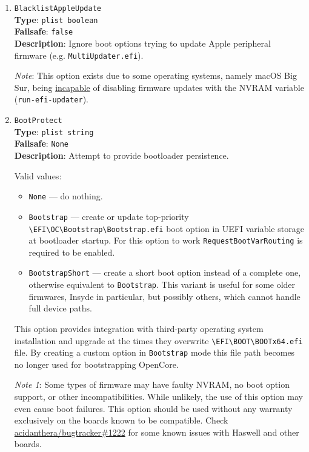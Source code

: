 \documentclass[]{article}
\providecommand{\tightlist}{%
  \setlength{\itemsep}{0pt}\setlength{\parskip}{0pt}}
\begin{document}
\begin{enumerate}
\item
  \texttt{BlacklistAppleUpdate}\\
  \textbf{Type}: \texttt{plist\ boolean}\\
  \textbf{Failsafe}: \texttt{false}\\
  \textbf{Description}: Ignore boot options trying to update Apple peripheral firmware
  (e.g. \texttt{MultiUpdater.efi}).

  \emph{Note}: This option exists due to some operating systems, namely macOS Big Sur,
  being \href{https://github.com/acidanthera/bugtracker/issues/1255}{incapable} of
  disabling firmware updates with the NVRAM variable (\texttt{run-efi-updater}).

\item
  \texttt{BootProtect}\\
  \textbf{Type}: \texttt{plist\ string}\\
  \textbf{Failsafe}: \texttt{None}\\
  \textbf{Description}: Attempt to provide bootloader persistence.

  Valid values:

  \begin{itemize}
  \tightlist
  \item \texttt{None} --- do nothing.
  \item \texttt{Bootstrap} --- create or update top-priority
  \texttt{\textbackslash EFI\textbackslash OC\textbackslash Bootstrap\textbackslash Bootstrap.efi}
  boot option in UEFI variable storage at bootloader startup. For this option
  to work \texttt{RequestBootVarRouting} is required to be enabled.
  \item \texttt{BootstrapShort} --- create a short boot option instead of a complete one,
  otherwise equivalent to \texttt{Bootstrap}. This variant is useful for some older firmwares,
  Insyde in particular, but possibly others, which cannot handle full device paths.
  \end{itemize}

  This option provides integration with third-party operating system installation and upgrade
  at the times they overwrite \texttt{\textbackslash EFI\textbackslash BOOT\textbackslash BOOTx64.efi}
  file. By creating a custom option in \texttt{Bootstrap} mode this file path becomes no longer
  used for bootstrapping OpenCore.

  \emph{Note 1}: Some types of firmware may have faulty NVRAM, no boot option support, or other
  incompatibilities. While unlikely, the use of this option may even cause boot failures.
  This option should be used without any warranty exclusively on the boards known to be compatible.
  Check \href{https://github.com/acidanthera/bugtracker/issues/1222}{acidanthera/bugtracker\#1222}
  for some known issues with Haswell and other boards.


\end{enumerate}
\end{document}
